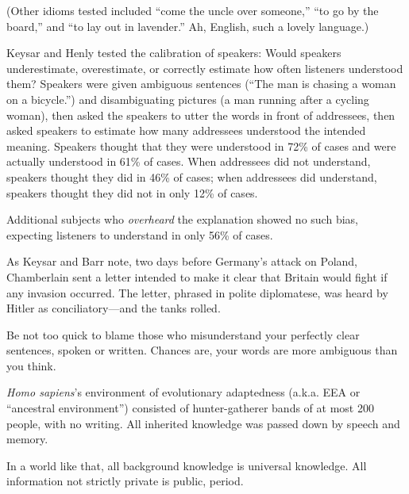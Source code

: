 {
 (Other idioms tested included ``come the uncle
over someone,'' ``to go by the
board,'' and ``to lay out in
lavender.'' Ah, English, such a lovely language.)}

{
 Keysar and Henly tested the calibration of speakers: Would
speakers underestimate, overestimate, or correctly estimate how often
listeners understood them? Speakers were given
ambiguous sentences (``The man is chasing a woman on a
bicycle.'') and disambiguating pictures (a man
running after a cycling woman), then asked the speakers to utter the
words in front of addressees, then asked speakers to estimate how many
addressees understood the intended meaning. Speakers thought that they
were understood in 72\% of cases and were actually understood in 61\%
of cases. When addressees did not understand, speakers thought they did
in 46\% of cases; when addressees did understand, speakers thought they
did not in only 12\% of cases.}

{
 Additional subjects who \textit{overheard} the explanation showed
no such bias, expecting listeners to understand in only 56\% of cases.}

{
 As Keysar and Barr note, two days before Germany's
attack on Poland, Chamberlain sent a letter intended to make it clear
that Britain would fight if any invasion occurred.
The letter, phrased in polite diplomatese, was heard by Hitler as
conciliatory---and the tanks rolled.}

{
 Be not too quick to blame those who misunderstand your perfectly
clear sentences, spoken or written. Chances are, your words are more
ambiguous than you think.}

\myendsectiontext


\bigskip


{
 \textit{Homo sapiens}'s environment of
evolutionary adaptedness (a.k.a. EEA or ``ancestral
environment'') consisted of hunter-gatherer bands of
at most 200 people, with no writing. All inherited knowledge was passed
down by speech and memory. }

{
 In a world like that, all background knowledge is universal
knowledge. All information not strictly private is public, period.}

